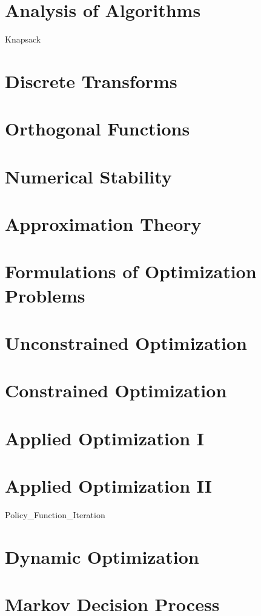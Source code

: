\documentclass{newsiambook}
\begin{document}
\part{Analysis of Algorithms}

{Knapsack}

\part{Discrete Transforms}

\part{Orthogonal Functions}

\part{Numerical Stability}

\part{Approximation Theory}

\part{Formulations of Optimization Problems}

\part{Unconstrained Optimization}

\part{Constrained Optimization}

\part{Applied Optimization I}

\part{Applied Optimization II}
{Policy_Function_Iteration}
\part{Dynamic Optimization}

\part{Markov Decision Process}
\end{document}
